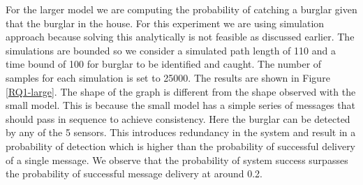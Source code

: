 For the larger model we are computing the probability of catching a burglar given that the burglar in the house. For this experiment we are using simulation approach because solving this analytically is not feasible as discussed earlier. The simulations are bounded so we consider a simulated path length of 110 and a time bound of 100 for burglar to be identified and caught. The number of samples for each simulation is set to 25000. The results are shown in Figure \ref{RQ1-large}. The shape of the graph is different from the shape observed with the small model. This is because the small model has a simple series of messages that should pass in sequence to achieve consistency. Here the burglar can be detected by any of the 5 sensors. This introduces redundancy in the system and result in a probability of detection which is higher than the probability of successful delivery of a single message. We observe that the probability of system success surpasses the probability of successful message delivery at around 0.2. 
